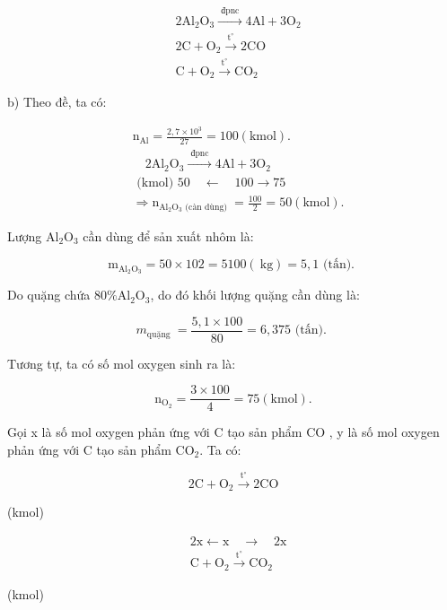 \documentclass[10pt]{article}
\begin{document}
$$
\begin{aligned}
& 2 \mathrm{Al}_{2} \mathrm{O}_{3} \xrightarrow{\text { đpnc }} 4 \mathrm{Al}+3 \mathrm{O}_{2} \\
& 2 \mathrm{C}+\mathrm{O}_{2} \xrightarrow{\mathrm{t}^{\circ}} 2 \mathrm{CO} \\
& \mathrm{C}+\mathrm{O}_{2} \xrightarrow{\mathrm{t}^{\circ}} \mathrm{CO}_{2}
\end{aligned}
$$

b) Theo đề, ta có:

$$
\begin{aligned}
& \mathrm{n}_{\mathrm{Al}}=\frac{2,7 \times 10^{3}}{27}=100(\mathrm{kmol}) . \\
& \quad 2 \mathrm{Al}_{2} \mathrm{O}_{3} \xrightarrow{\text { đpnc }} 4 \mathrm{Al}+3 \mathrm{O}_{2} \\
& \text { (kmol) } 50 \quad \leftarrow \quad 100 \rightarrow 75 \\
& \Rightarrow \mathrm{n}_{\mathrm{Al}_{2} \mathrm{O}_{3} \text { (càn dùng) }}=\frac{100}{2}=50(\mathrm{kmol}) .
\end{aligned}
$$

Lượng $\mathrm{Al}_{2} \mathrm{O}_{3}$ cần dùng để sản xuất nhôm là:

$$
\mathrm{m}_{\mathrm{Al}_{2} \mathrm{O}_{3}}=50 \times 102=5100(\mathrm{~kg})=5,1 \text { (tấn). }
$$

Do quặng chứa $80 \% \mathrm{Al}_{2} \mathrm{O}_{3}$, do đó khối lượng quặng cần dùng là:

$$
m_{\text {quặng }}=\frac{5,1 \times 100}{80}=6,375 \text { (tấn). }
$$

Tương tự, ta có số mol oxygen sinh ra là:

$$
\mathrm{n}_{\mathrm{O}_{2}}=\frac{3 \times 100}{4}=75(\mathrm{kmol}) .
$$

Gọi x là số mol oxygen phản ứng với C tạo sản phẩm CO , y là số mol oxygen phản ứng với C tạo sản phẩm $\mathrm{CO}_{2}$. Ta có:

$$
2 \mathrm{C}+\mathrm{O}_{2} \xrightarrow{\mathrm{t}^{\circ}} 2 \mathrm{CO}
$$

(kmol)

$$
\begin{aligned}
& 2 \mathrm{x} \leftarrow \mathrm{x} \quad \rightarrow \quad 2 \mathrm{x} \\
& \mathrm{C}+\mathrm{O}_{2} \xrightarrow{\mathrm{t}^{\circ}} \mathrm{CO}_{2}
\end{aligned}
$$

(kmol)
\end{document}
